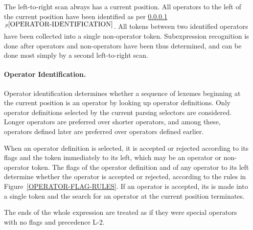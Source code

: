 \documentclass[12pt]{article}
\newcommand{\subsubsubsection}[1]{\paragraph[#1]{#1.}}
\newcommand{\itemref}[1]{\ref{#1}$\,^{p\pageref{#1}}$}
\begin{document}
The left-to-right scan always has a current position.
All operators to the left of the current position have been
identified as per \itemref{OPERATOR-IDENTIFICATION}.
All tokens between two identified operators have been collected
into a single non-operator token.
Subexpression recognition is done after operators
and non-operators have been thus determined, and can be done
most simply by a second left-to-right scan.

\subsubsubsection{Operator Identification}
\label{OPERATOR-IDENTIFICATION}

Operator identification determines whether a sequence of lexemes
beginning at the current position is an operator by looking up
operator definitions.  Only
operator definitions selected by the current parsing selectors are
considered.  Longer operators are preferred over shorter
operators, and among these, operators defined later are
preferred over operators defined earlier.

When an operator definition is selected, it is accepted or rejected
according to its flags and the token immediately to its left, which
may be an operator or non-operator token.  The flags of the operator
definition and of any operator to its left determine whether the
operator is accepted or rejected, according to the rules in
Figure~\ref{OPERATOR-FLAG-RULES}.  If an operator is accepted,
its is made into a single token and the search for an operator
at the current position terminates.

The ends of the whole expression are treated as if they were
special operators with no flags and precedence L-2.
\end{document}
